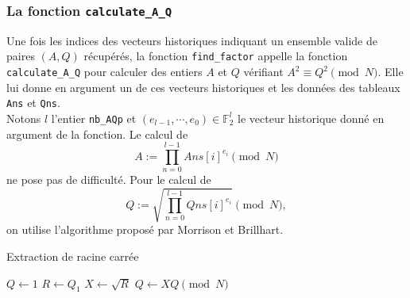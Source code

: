 \begin{algorithm}[H]
\end{algorithm}
\vspace{1em}

\subsubsection{La fonction \texttt{calculate\_A\_Q}}

Une fois les indices des vecteurs historiques indiquant un ensemble valide de
paires $(A, Q)$ récupérés, la fonction \texttt{find\_factor} appelle la
fonction \texttt{calculate\_A\_Q} pour calculer des entiers $A$ et $Q$
vérifiant $A^2 \equiv Q^2 \pmod{N}$. Elle lui donne en argument un de ces
vecteurs historiques et les données des tableaux \texttt{Ans} et \texttt{Qns}.
\\

Notons $l$ l'entier \texttt{nb\_AQp} et $(e_{l-1}, \cdots , e_0) \in
\mathbb{F}_2^{l}$ le vecteur historique donné en argument de la fonction. Le
calcul de \[A:= \prod_{n=0}^{l-1} Ans[i]^{e_i} \pmod{N} \] ne pose pas de
difficulté. Pour le calcul de \[Q:= \sqrt{\prod_{n=0}^{l-1 } Qns[i] ^{e_i}}
\pmod{N},\] on utilise l'algorithme proposé par Morrison et Brillhart.

\vspace{1em}
\begin{algorithm}[H]
\DontPrintSemicolon
\caption{\sc Extraction de racine carrée}
$Q \gets 1$\;
$R \gets Q_1$\;
$X \gets \sqrt{R}$\;
    $Q \gets XQ \pmod{N}$\;
\;
\end{algorithm}
\vspace{1em}

